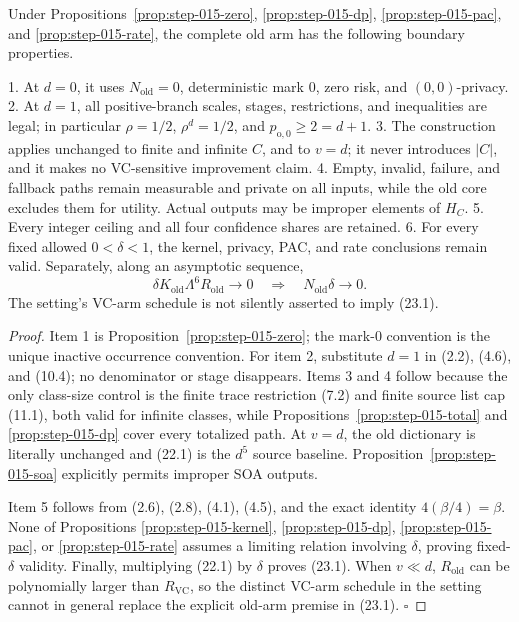 \begin{proposition}\label{prop:step-015-boundaries}
Under Propositions~\ref{prop:step-015-zero},
\ref{prop:step-015-dp}, \ref{prop:step-015-pac}, and
\ref{prop:step-015-rate}, the complete old arm has the following boundary
properties.

1. At \(d=0\), it uses \(N_{\mathrm{old}}=0\), deterministic mark \(0\),
   zero risk, and \((0,0)\)-privacy.
2. At \(d=1\), all positive-branch scales, stages, restrictions, and
   inequalities are legal; in particular \(\rho=1/2\),
   \(\rho^d=1/2\), and \(p_{\mathrm o,0}\ge2=d+1\).
3. The construction applies unchanged to finite and infinite \(C\), and to
   \(v=d\); it never introduces \(|C|\), and it makes no VC-sensitive
   improvement claim.
4. Empty, invalid, failure, and fallback paths remain measurable and
   private on all inputs, while the old core excludes them for utility.
   Actual outputs may be improper elements of \(H_C\).
5. Every integer ceiling and all four confidence shares are retained.
6. For every fixed allowed \(0<\delta<1\), the kernel, privacy, PAC, and
   rate conclusions remain valid. Separately, along an asymptotic sequence,
   \[
   \delta K_{\mathrm{old}}\Lambda^6R_{\mathrm{old}}\longrightarrow0
   \quad\Longrightarrow\quad
   N_{\mathrm{old}}\delta\longrightarrow0.
   \tag{23.1}
   \]
   The setting's VC-arm schedule is not silently asserted to imply
   (23.1).


\end{proposition}

\begin{proof}
Item 1 is Proposition~\ref{prop:step-015-zero}; the mark-\(0\) convention
is the unique inactive occurrence convention. For item 2, substitute
\(d=1\) in (2.2), (4.6), and (10.4); no denominator or stage disappears.
Items 3 and 4 follow because the only class-size control is the finite
trace restriction (7.2) and finite source list cap (11.1), both valid for
infinite classes, while Propositions~\ref{prop:step-015-total} and
\ref{prop:step-015-dp} cover every totalized path. At \(v=d\), the old
dictionary is literally unchanged and (22.1) is the \(d^5\) source
baseline. Proposition~\ref{prop:step-015-soa} explicitly permits improper
SOA outputs.

Item 5 follows from (2.6), (2.8), (4.1), (4.5), and the exact identity
\(4(\beta/4)=\beta\). None of Propositions
\ref{prop:step-015-kernel}, \ref{prop:step-015-dp},
\ref{prop:step-015-pac}, or \ref{prop:step-015-rate} assumes a limiting
relation involving \(\delta\), proving fixed-\(\delta\) validity. Finally,
multiplying (22.1) by \(\delta\) proves (23.1). When \(v\ll d\),
\(R_{\mathrm{old}}\) can be polynomially larger than \(R_{\mathrm{VC}}\),
so the distinct VC-arm schedule in the setting cannot in general replace
the explicit old-arm premise in (23.1). \(\square\)


\end{proof}

